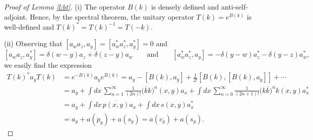 \documentclass[11pt,a4paper,DIV11]{scrartcl}	%
\newcommand{\N}{\mathcal{N}}
\begin{document}
\begin{proof}[Proof of Lemma \ref{l:bt}]
  (i) The operator $B(k)$ is densely defined and anti-self-adjoint.
  Hence, by the spectral theorem, the unitary operator $T(k) = e^{B(k)}$ is
  well-defined and $T(k)^* = T(k)^{-1} = T(-k)$.
\iffalse
  Let $\chi$ be the characteristic function, and consider a real number $M >
  0$. We give a proof of the formulae on the subspace $\chi(\N \le M)
  \mathcal{F}$, and then we indicate how to extend it to the whole
  $\mathcal{F}$. First, note that $B(k)$ and $a(f)$ are bounded operators on
  $\chi(\N \le M) \mathcal{F}$. Recall the formula
  \[
    e^X Y e^{-X} = Y + [X,Y] + \frac{1}{2!} [X,[X,Y]] + \cdots
  \]
\fi

  (ii) Observing that $[a_w a_z, a_y] = [a_w^* a_z^*, a_y^*] = 0$ and
  \[
    [a_w a_z, a_y^*] = \delta(w-y) a_z + \delta(z-y) a_w \qquad \text{and}
    \qquad [a_w^* a_z^*, a_y] = -\delta(y-w) a_z^* - \delta(y-z) a_w^*,
  \]
  we easily find the expression
  \begin{align*}
    T(k)^* a_y T(k) & = e^{-B(k)} a_y e^{B(k)} = a_y - [B(k), a_y] +
    \frac{1}{2!} [B(k), [B(k), a_y]] + \cdots \\
    & = a_y + \int dx \, \sum_{n=1}^\infty \frac{1}{(2n)!} \big( 
    \overline{k} k \big)^n(x,y) a_x + \int dx \, \sum_{n=0}^\infty
    \frac{1}{(2n+1)!} \big( k \overline{k} \big)^n k(x,y) a_x^* \\
    & = a_y + \int dx \, \overline{p(x,y)} a_x + \int dx \, s(x,y) a_x^* \\
    & = a_y + a(p_y) + a(s_y) = a(c_y) + a(s_y).
  \end{align*}



\end{proof}
\end{document}
